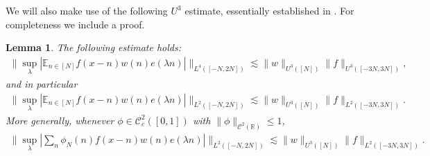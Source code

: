 \documentclass[12pt]{amsart}
\numberwithin{equation}{section}
\newtheorem{lemma}[theorem]{Lemma}
\theoremstyle{definition}
\begin{document}
We will also make use of the following $U^3$ estimate, essentially established in \cite[Proposition 1.14]{F+}. For completeness we include a proof.
\begin{lemma}\label{e:U3maxmod}
The following estimate holds:
\begin{align}
    \| \sup_\lambda |\mathbb{E}_{n \in [N]} f(x-n) w(n) e(\lambda n)| \|_{L^4([-N,2N])} \lesssim \| w \|_{U^3([N])} \|f \|_{U^3([-3N,3N])},
\end{align}
and in particular
\begin{align}
    \| \sup_\lambda |\mathbb{E}_{n \in [N]} f(x-n) w(n) e(\lambda n)| \|_{L^2([-N,2N])} \lesssim \| w \|_{U^3([N])} \|f \|_{L^2([-3N,3N])}.
\end{align}
More generally, whenever $\phi \in \mathcal{C}_c^2([0,1])$ with $\| \phi \|_{\mathcal{C}^2(\mathbb{R})} \leq 1$,
\begin{align}
    \| \sup_\lambda |\sum_n \phi_N(n) f(x-n) w(n) e(\lambda n)| \|_{L^2([-N,2N])} \lesssim \| w \|_{U^3([N])} \|f \|_{L^2([-3N,3N])}.
\end{align}
\end{lemma}
\end{document}

